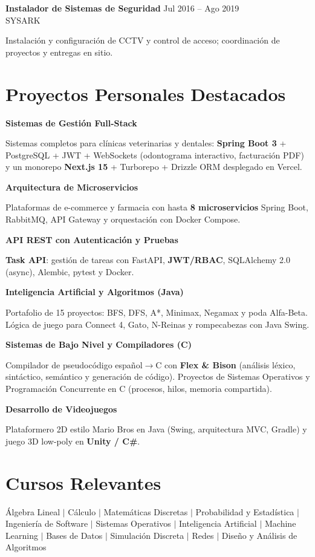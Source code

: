 \documentclass[10pt,letterpaper]{article}
\newcommand{\entry}[4]{%
  \noindent
  \textbf{#1} \hfill {\small\color{textsec}#2}\\
  {\small\color{accent}#3}
  \vspace{0.08cm}
  \par\noindent#4
  \par\vspace{0.16cm}
}
\newcommand{\entrysimple}[2]{%
  \noindent\textbf{#1}\par
  \vspace{0.04cm}
  \noindent#2
  \vspace{0.14cm}\par
}
\begin{document}
\entry{Instalador de Sistemas de Seguridad}
       {Jul 2016 -- Ago 2019}
       {SYSARK}
       {Instalaci\'{o}n y configuraci\'{o}n de CCTV y control de acceso; coordinaci\'{o}n de proyectos y entregas en sitio.}
       
       
       
\newpage
\section*{Proyectos Personales Destacados}
\entrysimple{Sistemas de Gesti\'{o}n Full-Stack}
       {Sistemas completos para cl\'{i}nicas veterinarias y dentales: \textbf{Spring Boot 3} + PostgreSQL + JWT + WebSockets (odontograma interactivo, facturaci\'{o}n PDF) y un monorepo \textbf{Next.js 15} + Turborepo + Drizzle ORM desplegado en Vercel.}

\entrysimple{Arquitectura de Microservicios}
       {Plataformas de e-commerce y farmacia con hasta \textbf{8 microservicios} Spring Boot, RabbitMQ, API Gateway y orquestaci\'{o}n con Docker Compose.}

\entrysimple{API REST con Autenticaci\'{o}n y Pruebas}
       {\textbf{Task API}: gesti\'{o}n de tareas con FastAPI, \textbf{JWT/RBAC}, SQLAlchemy 2.0 (async), Alembic, pytest y Docker.}

\entrysimple{Inteligencia Artificial y Algoritmos (Java)}
       {Portafolio de 15 proyectos: BFS, DFS, A*, Minimax, Negamax y poda Alfa-Beta. L\'{o}gica de juego para Connect 4, Gato, N-Reinas y rompecabezas con Java Swing.}

\entrysimple{Sistemas de Bajo Nivel y Compiladores (C)}
       {Compilador de pseudoc\'{o}digo espa\~{n}ol$\rightarrow$C con \textbf{Flex \& Bison} (an\'{a}lisis l\'{e}xico, sint\'{a}ctico, sem\'{a}ntico y generaci\'{o}n de c\'{o}digo). Proyectos de Sistemas Operativos y Programaci\'{o}n Concurrente en C (procesos, hilos, memoria compartida).}

\entrysimple{Desarrollo de Videojuegos}
       {Plataformero 2D estilo Mario Bros en Java (Swing, arquitectura MVC, Gradle) y juego 3D low-poly en \textbf{Unity / C\#}.}


\vspace{0.5cm}
\section*{Cursos Relevantes}
\noindent
{\small\color{textsec}
\'{A}lgebra Lineal \;$\mid$\; C\'{a}lculo \;$\mid$\; Matem\'{a}ticas Discretas \;$\mid$\; Probabilidad y Estad\'{i}stica \;$\mid$\;
Ingenier\'{i}a de Software \;$\mid$\; Sistemas Operativos \;$\mid$\; Inteligencia Artificial \;$\mid$\; Machine Learning \;$\mid$\;
Bases de Datos \;$\mid$\; Simulaci\'{o}n Discreta \;$\mid$\; Redes \;$\mid$\; Dise\~{n}o y An\'{a}lisis de Algoritmos}
\end{document}
